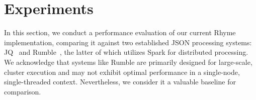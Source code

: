 \documentclass[runningheads]{llncs}
\newcommand{\lang}{Rhyme}
\begin{document}




\section{Experiments}\label{sec:experiments}




In this section, we conduct a performance evaluation of our current \lang{}
implementation, comparing it against two established JSON processing
systems: JQ~\cite{jq} and Rumble~\cite{rumble_vldb}, the latter of which
utilizes Spark for distributed processing.
We acknowledge that systems like Rumble are primarily designed for large-scale,
cluster execution and may not exhibit optimal performance in a single-node,
single-threaded context.
Nevertheless, we consider it a valuable baseline for comparison.
\end{document}
